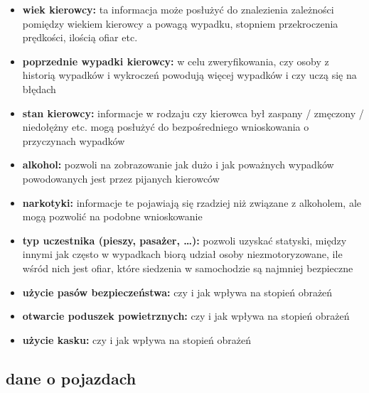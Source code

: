 \begin{itemize}
\itemsep1pt\parskip0pt
\item
  \textbf{wiek kierowcy:} ta informacja może posłużyć do znalezienia
  zależności pomiędzy wiekiem kierowcy a powagą wypadku, stopniem
  przekroczenia prędkości, ilością ofiar etc.\\
\item
  \textbf{poprzednie wypadki kierowcy:} w celu zweryfikowania, czy osoby
  z historią wypadków i wykroczeń powodują więcej wypadków i czy uczą
  się na błędach\\
\item
  \textbf{stan kierowcy:} informacje w rodzaju czy kierowca był zaspany
  / zmęczony / niedołężny etc. mogą posłużyć do bezpośredniego
  wnioskowania o przyczynach wypadków\\
\item
  \textbf{alkohol:} pozwoli na zobrazowanie jak dużo i jak poważnych
  wypadków powodowanych jest przez pijanych kierowców\\
\item
  \textbf{narkotyki:} informacje te pojawiają się rzadziej niż związane
  z alkoholem, ale mogą pozwolić na podobne wnioskowanie\\
\item
  \textbf{typ uczestnika (pieszy, pasażer, \ldots{}):} pozwoli uzyskać
  statyski, między innymi jak często w wypadkach biorą udział osoby
  niezmotoryzowane, ile wśród nich jest ofiar, które siedzenia w
  samochodzie są najmniej bezpieczne\\
\item
  \textbf{użycie pasów bezpieczeństwa:} czy i jak wpływa na stopień
  obrażeń\\
\item
  \textbf{otwarcie poduszek powietrznych:} czy i jak wpływa na stopień
  obrażeń\\
\item
  \textbf{użycie kasku:} czy i jak wpływa na stopień obrażeń
\end{itemize}

\subsection{dane o pojazdach}\label{dane-o-pojazdach}

